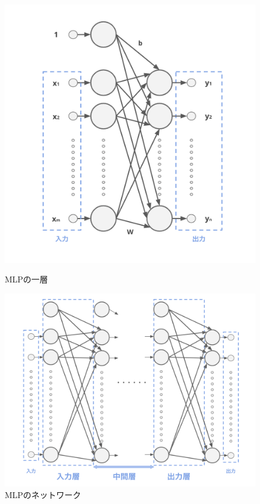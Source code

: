 \begin{figure}[b]
\centering
\begin{minipage}{0.4\columnwidth}
\centering
\includegraphics[width=0.95\columnwidth]{figure/mlp_net0.png}
\caption{MLPの一層}
\label{fig:MLP_net0}
\end{minipage}
\begin{minipage}{0.55\columnwidth}
\centering
\includegraphics[width=0.9\columnwidth]{figure/mlp_net1.png}
\caption{MLPのネットワーク}
\label{fig:MLP_net1}
\end{minipage}
\end{figure}

